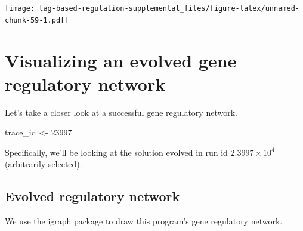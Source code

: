 \documentclass[]{book}
\newenvironment{Shaded}{\begin{snugshade}}{\end{snugshade}}
\newcommand{\DecValTok}[1]{\textcolor[rgb]{0.00,0.00,0.81}{#1}}
\newcommand{\NormalTok}[1]{#1}
\newcommand{\StringTok}[1]{\textcolor[rgb]{0.31,0.60,0.02}{#1}}
\begin{document}
\texttt{[image: tag-based-regulation-supplemental\_files/figure-latex/unnamed-chunk-59-1.pdf]}

\hypertarget{visualizing-an-evolved-gene-regulatory-network}{%
\section{Visualizing an evolved gene regulatory network}\label{visualizing-an-evolved-gene-regulatory-network}}

Let's take a closer look at a successful gene regulatory network.

\begin{Shaded}
\begin{Highlighting}[]
\NormalTok{trace_id <-}\StringTok{ }\DecValTok{23997}
\end{Highlighting}
\end{Shaded}

Specifically, we'll be looking at the solution evolved in run id \ensuremath{2.3997\times 10^{4}} (arbitrarily selected).

\hypertarget{evolved-regulatory-network-1}{%
\subsection{Evolved regulatory network}\label{evolved-regulatory-network-1}}

We use the igraph package to draw this program's gene regulatory network.
\end{document}
